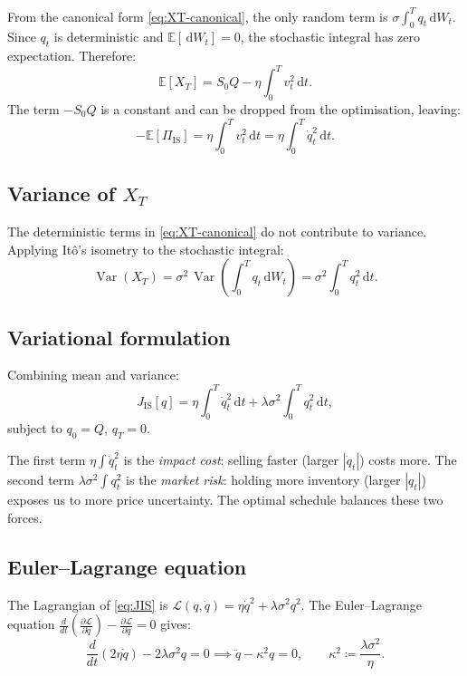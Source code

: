 \documentclass[12pt, a4paper]{article}
\newcommand{\E}{\mathbb{E}}
\newcommand{\Var}{\operatorname{Var}}
\newcommand{\dd}{\,\mathrm{d}}
\newcommand{\kap}{\kappa}
\begin{document}
From the canonical form \eqref{eq:XT-canonical}, the only random term is
$\sigma\int_0^T q_t \dd W_t$. Since $q_t$ is deterministic and
$\E[\dd W_t] = 0$, the stochastic integral has zero expectation. Therefore:
\[
  \E[X_T] = S_0 Q - \eta\!\int_0^T v_t^2 \dd t.
\]
The term $-S_0 Q$ is a constant and can be dropped from the optimisation, leaving:
\[
  -\E[\Pi_{\mathrm{IS}}] = \eta\!\int_0^T v_t^2 \dd t = \eta\!\int_0^T \dot q_t^2 \dd t.
\]

\subsection{Variance of \texorpdfstring{$X_T$}{XT}}

The deterministic terms in \eqref{eq:XT-canonical} do not contribute to variance.
Applying It\^{o}'s isometry to the stochastic integral:
\[
  \Var(X_T)
  = \sigma^2\,\Var\!\left(\int_0^T q_t \dd W_t\right)
  = \sigma^2\!\int_0^T q_t^2 \dd t.
\]

\subsection{Variational formulation}

Combining mean and variance:
\begin{equation}
  J_{\mathrm{IS}}[q]
  = \eta\!\int_0^T \dot q_t^2 \dd t + \lambda\sigma^2\!\int_0^T q_t^2 \dd t,
  \label{eq:JIS}
\end{equation}
subject to $q_0 = Q$, $q_T = 0$.

\begin{notebox}
  The first term $\eta\int\dot q_t^2$ is the \emph{impact cost}: selling faster
  (larger $|\dot q_t|$) costs more. The second term $\lambda\sigma^2\int q_t^2$
  is the \emph{market risk}: holding more inventory (larger $|q_t|$) exposes us to
  more price uncertainty. The optimal schedule balances these two forces.
\end{notebox}

\subsection{Euler--Lagrange equation}

The Lagrangian of \eqref{eq:JIS} is $\mathcal{L}(q, \dot q) = \eta\dot q^2 + \lambda\sigma^2 q^2$.
The Euler--Lagrange equation
$\frac{d}{dt}\!\left(\frac{\partial\mathcal{L}}{\partial\dot q}\right)
 - \frac{\partial\mathcal{L}}{\partial q} = 0$
gives:
\[
  \frac{d}{dt}(2\eta\dot q) - 2\lambda\sigma^2 q = 0
  \implies
  \ddot q - \kap^2 q = 0,
  \qquad \kap^2 \coloneqq \frac{\lambda\sigma^2}{\eta}.
\]
\end{document}
